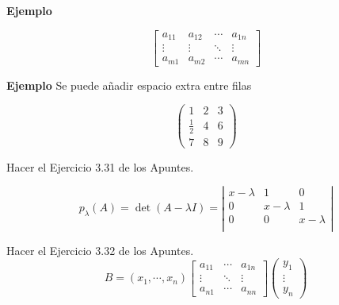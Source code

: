 \documentclass[11pt,a4paper]{report}
\begin{document}
\bigskip
\textbf{Ejemplo}

\begin{equation*}
\left[
\begin{array}{cccc}
a_{11} & a_{12} & \cdots & a_{1n} \\
\vdots & \vdots & \ddots & \vdots \\
a_{m1} & a_{m2} & \cdots & a_{mn}
\end{array}
\right]
\end{equation*}

\bigskip





\bigskip
\textbf{Ejemplo} Se puede añadir espacio extra entre filas

\begin{equation*}
\left(
\begin{array}{ccc}
1 & 2 & 3 \\[2pt]
\frac{1}{2} & 4 & 6 \\
7 & 8 & 9
\end{array}
\right)
\end{equation*}

\bigskip





\bigskip
  Hacer el Ejercicio 3.31 de los Apuntes.

\begin{equation*}
p_\lambda(A)=\det(A-\lambda I)= \left|
\begin{array}{ccc}
x-\lambda & 1 & 0 \\
0 & x-\lambda & 1 \\
0 & 0 & x-\lambda \\
\end{array}
\right|
\end{equation*}

\bigskip





\bigskip
  Hacer el Ejercicio 3.32 de los Apuntes.
\begin{equation}
B = (x_1,\cdots,x_n)\left[
\begin{array}{ccc}
a_{11} & \cdots & a_{1n} \\
\vdots & \ddots & \vdots \\
a_{n1} & \cdots & a_{nn}
\end{array}
\right]\left(
\begin{array}{c}
y_1 \\
\vdots \\
y_n
\end{array}
\right)
\end{equation}
\end{document}

